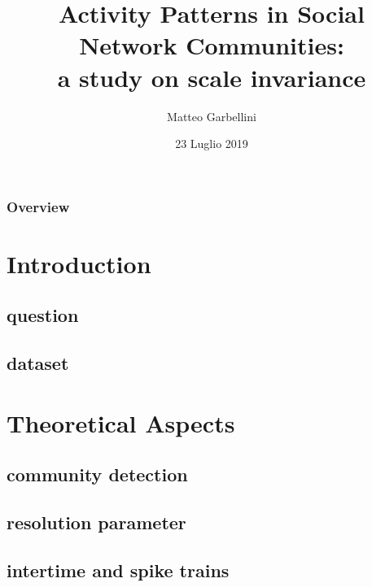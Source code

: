 \documentclass{beamer}
\title[Activity Patterns in Network Communities]{Activity Patterns in Social Network Communities:  \\ a study on scale invariance}
\author{Matteo Garbellini}
\institute[Unimi] 
{
Universit\`a degli Studi di Milano \\ 
\medskip
\textit{matteo.garbellini@studenti.unimi.it} 
}
\date{23 Luglio 2019}
\begin{document}
\begin{frame}
\titlepage 
\end{frame}

\begin{frame}
\frametitle{Overview} %
\tableofcontents %
\end{frame}


\section{Introduction} 

\subsection{question}
\subsection{dataset} 

\section{Theoretical Aspects}
\subsection{community detection}
\subsection{resolution parameter}
\subsection{intertime and spike trains}
\end{document}
